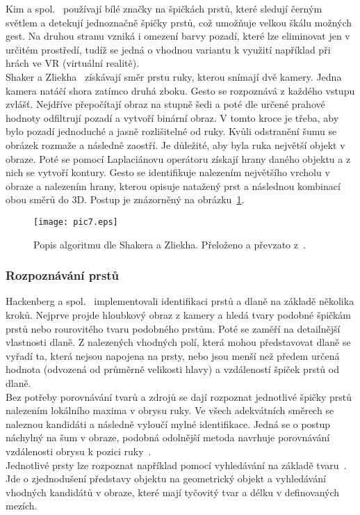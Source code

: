 Kim a spol.~\cite{5} používají bílé značky na špičkách prstů, které sledují černým světlem a detekují jednoznačně špičky prstů, což umožňuje velkou škálu možných gest. Na druhou stranu vzniká i omezení barvy pozadí, které lze eliminovat jen v určitém prostředí, tudíž se jedná o vhodnou variantu k využití například při hrách ve VR (virtuální realitě).\\

Shaker a Zliekha~\cite{12} získávají směr prstu ruky, kterou snímají dvě kamery. Jedna kamera natáčí shora zatímco druhá zboku. Gesto se rozpoznává z každého vstupu zvlášť. Nejdříve přepočítají obraz na stupně šedi a poté dle určené prahové hodnoty odfiltrují pozadí a vytvoří binární obraz. V tomto kroce je třeba, aby bylo pozadí jednoduché a jasně rozlišitelné od ruky. Kvůli odstranění šumu se obrázek rozmaže a následně zaostří. Je důležité, aby byla ruka největší objekt v obraze. Poté se pomocí Laplaciánovu operátoru získají hrany daného objektu a z nich se vytvoří kontury.
Gesto se identifikuje nalezením největšího vrcholu v obraze a nalezením hrany, kterou opisuje natažený prst a následnou kombinací obou směrů do 3D. Postup je znázorněný na obrázku~\ref{pic7}.

\begin{figure}[h]
\centering
\texttt{[image: pic7.eps]}
\caption{Popis algoritmu dle Shakera a Zliekha. Přeloženo a převzato z~\cite{12}. } 
\label{pic7}
\end{figure}

\subsubsection{Rozpoznávání prstů}
Hackenberg a spol.~\cite{12} implementovali identifikaci prstů a dlaně na základě několika kroků. Nejprve projde hloubkový obraz z kamery a hledá tvary podobné špičkám prstů nebo rourovitého tvaru podobného prstům. Poté se zaměří na detailnější vlastnosti dlaně. Z nalezených vhodných polí, která mohou představovat dlaně se vyřadí ta, která nejsou napojena na prsty, nebo jsou menší než předem určená hodnota (odvozená od průměrně velikosti hlavy) a vzdáleností špiček prstů od dlaně.\\


Bez potřeby porovnávání tvarů a zdrojů se dají rozpoznat jednotlivé špičky prstů nalezením lokálního maxima v obrysu ruky. Ve všech adekvátních směrech se naleznou kandidáti a následně vyloučí mylné identifikace. Jedná se o postup náchylný na šum v obraze, podobná odolnější metoda navrhuje porovnávání vzdálenosti obrysu k pozici ruky~\cite{3}.\\
Jednotlivé prsty lze rozpoznat například pomocí vyhledávání na základě tvaru~\cite{4}. Jde o zjednodušení představy objektu na geometrický objekt a vyhledávání vhodných kandidátů v obraze, které mají tyčovitý tvar a délku v definovaných mezích. 

